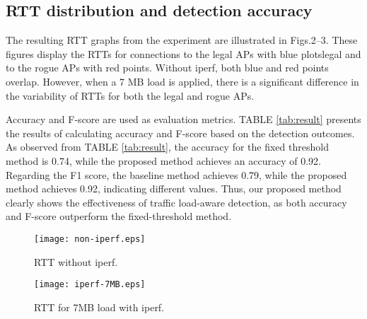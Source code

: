 \documentclass[conference]{IEEEtran}
\begin{document}
 \begin{table}[b]
 \centering
 \caption{Detection result} \label{tab:result}
\end{table}


\subsection{RTT distribution and detection accuracy}
The resulting RTT graphs from the experiment are illustrated in Figs.2--3. These figures display the RTTs for connections to the legal APs with blue plotslegal and to the rogue APs with red points. Without iperf, both blue and red points overlap. However, when a 7 MB load is applied, there is a significant difference in the variability of RTTs for both the legal and rogue APs. \par
Accuracy and F-score are used as evaluation metrics. TABLE \ref{tab:result} presents the results of calculating accuracy and F-score based on the detection outcomes. As observed from TABLE \ref{tab:result}, the accuracy for the fixed threshold method is 0.74, while the proposed method achieves an accuracy of 0.92. Regarding the F1 score, the baseline method achieves 0.79, while the proposed method achieves 0.92, indicating different values. Thus, our proposed method clearly shows the effectiveness of traffic load-aware detection, as both accuracy and F-score outperform the fixed-threshold method.



\begin{figure}[t]
  \centering
  \texttt{[image: non-iperf.eps]}
  \caption{RTT without iperf.}
\end{figure}

\begin{figure}[t]
  \centering
  \texttt{[image: iperf-7MB.eps]}
  \caption{RTT for 7MB load with iperf.}
\end{figure}
\end{document}
